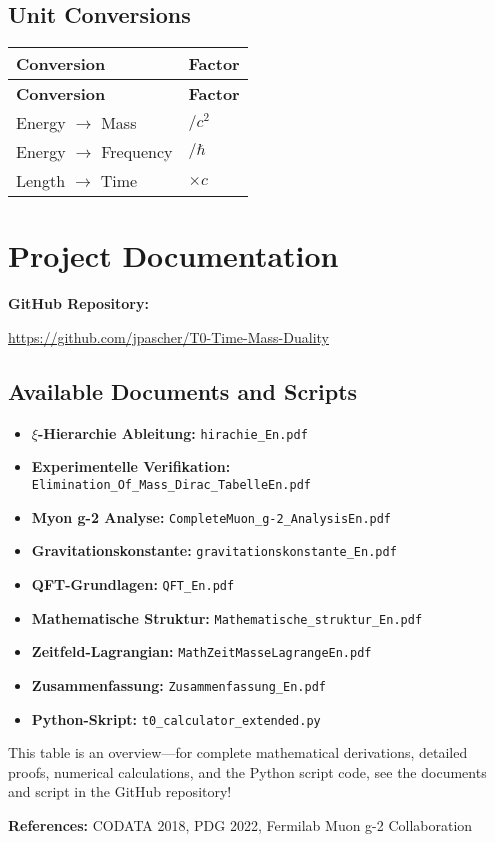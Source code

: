 \documentclass[12pt,a4paper]{article}
\begin{document}
	\subsection{Unit Conversions}
	\begin{longtable}{|p{5cm}|p{5cm}|}
		\hline
		\textbf{Conversion} & \textbf{Factor} \\
		\hline
		\endfirsthead
		\hline
		\textbf{Conversion} & \textbf{Factor} \\
		\hline
		\endhead
		Energy $\rightarrow$ Mass & $/c^{2}$ \\
		\hline
		Energy $\rightarrow$ Frequency & $/\hbar$ \\
		\hline
		Length $\rightarrow$ Time & $\times c$ \\
		\hline
	\end{longtable}
	
	\section{Project Documentation}
	\textbf{GitHub Repository:}
	\begin{center}
		\url{https://github.com/jpascher/T0-Time-Mass-Duality}
	\end{center}
	
	\subsection{Available Documents and Scripts}
	\begin{itemize}
	\item \textbf{$\xi$-Hierarchie Ableitung:} \texttt{hirachie\_En.pdf}
	\item \textbf{Experimentelle Verifikation:} \texttt{Elimination\_Of\_Mass\_Dirac\_TabelleEn.pdf}
	\item \textbf{Myon g-2 Analyse:} \texttt{CompleteMuon\_g-2\_AnalysisEn.pdf}
	\item \textbf{Gravitationskonstante:} \texttt{gravitationskonstante\_En.pdf}
	\item \textbf{QFT-Grundlagen:} \texttt{QFT\_En.pdf}
	\item \textbf{Mathematische Struktur:} \texttt{Mathematische\_struktur\_En.pdf}
	\item \textbf{Zeitfeld-Lagrangian:} \texttt{MathZeitMasseLagrangeEn.pdf}
	\item \textbf{Zusammenfassung:} \texttt{Zusammenfassung\_En.pdf}
	\item \textbf{Python-Skript:} \texttt{t0\_calculator\_extended.py}
\end{itemize}
	
	This table is an overview—for complete mathematical derivations, detailed proofs, numerical calculations, and the Python script code, see the documents and script in the GitHub repository!
	
	\textbf{References:} CODATA 2018, PDG 2022, Fermilab Muon g-2 Collaboration
	
\end{document}
